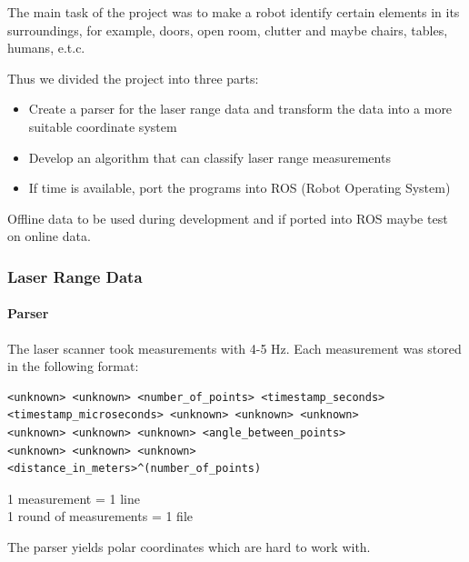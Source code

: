 \documentclass{beamer}
\begin{document}
\begin{frame}[shrink]
The main task of the project was to make a robot identify certain elements in its surroundings, for example, doors, open room, clutter and maybe chairs, tables, humans, e.t.c.

\vspace{10pt}

Thus we divided the project into three parts:

\begin{itemize}
\pause
\item{Create a parser for the laser range data and transform the data into a more suitable coordinate system}
\pause  
\item{Develop an algorithm that can classify laser range measurements}
\pause  
\item{If time is available, port the programs into ROS (Robot Operating System)}
\end{itemize}
\pause
Offline data to be used during development and if ported into ROS maybe test on online data.

\end{frame}

\begin{frame}[fragile]
\frametitle{Laser Range Data}
\framesubtitle{Parser}

The laser scanner took measurements with 4-5 Hz. Each measurement was stored in the following format:
\begin{verbatim}
<unknown> <unknown> <number_of_points> <timestamp_seconds>
<timestamp_microseconds> <unknown> <unknown> <unknown>
<unknown> <unknown> <unknown> <angle_between_points>
<unknown> <unknown> <unknown>
<distance_in_meters>^(number_of_points)
\end{verbatim}

1 measurement = 1 line
\\
1 round of measurements = 1 file

\pause
\vspace{10pt}

The parser yields polar coordinates which are hard to work with.

\end{frame}
\end{document}
